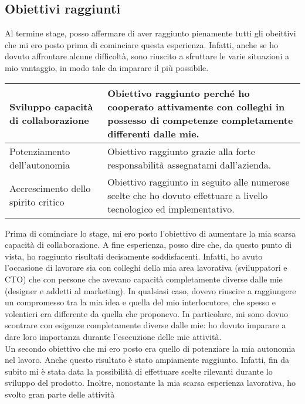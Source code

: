 		\subsection{Obiettivi raggiunti}
			Al termine stage, posso affermare di aver raggiunto pienamente tutti gli obeittivi che mi ero posto prima di cominciare
			questa esperienza. Infatti, anche se ho dovuto affrontare alcune difficoltà, sono riuscito a sfruttare le varie situazioni
			a mio vantaggio, in modo tale da imparare il più possibile.\\
			\begin{center}
				\begin{tabular}[H]{p{} | p{}}
					Sviluppo capacità di collaborazione &
					Obiettivo raggiunto perché ho cooperato attivamente con colleghi in possesso di competenze completamente
					differenti dalle mie.\\
					\hline
					Potenziamento dell'autonomia &
					Obiettivo raggiunto grazie alla forte responsabilità assegnatami dall'azienda.\\
					\hline
					Accrescimento dello spirito critico &
					Obiettivo raggiunto in seguito alle numerose scelte che ho dovuto effettuare a livello tecnologico ed
					implementativo.\\
				\end{tabular}
			\end{center}
			Prima di cominciare lo stage, mi ero posto l'obiettivo di aumentare la mia scarsa capacità di collaborazione. A fine
			esperienza, posso dire che, da questo punto di vista, ho raggiunto risultati decisamente soddisfacenti. Infatti, ho
			avuto l'occasione di lavorare sia con colleghi della mia area lavorativa (sviluppatori e CTO) che con persone che avevano
			capacità completamente diverse dalle mie (designer e addetti al marketing). In qualsiasi caso, dovevo riuscire a raggiungere
			un compromesso tra la mia idea e quella del mio interlocutore, che spesso e volentieri era differente da quella che
			proponevo. In particolare, mi sono dovuo scontrare con esigenze completamente diverse dalle mie: ho dovuto imparare a dare
			loro importanza durante l'esecuzione delle mie attività.\\
			Un secondo obiettivo che mi ero posto era quello di potenziare la mia autonomia nel lavoro. Anche questo risultato è stato
			ampiamente raggiunto. Infatti, fin da subito mi è stata data la possibilità di effettuare scelte rilevanti durante lo
			sviluppo del prodotto. Inoltre, nonostante la mia scarsa esperienza lavorativa, ho svolto gran parte delle attività

